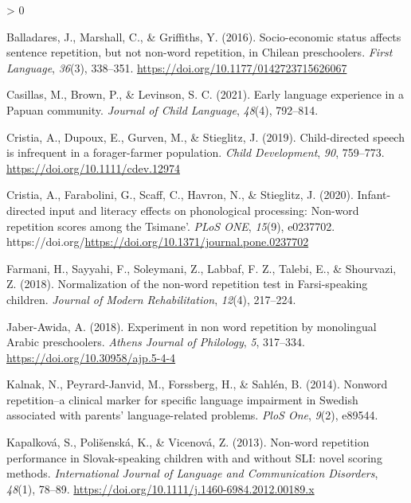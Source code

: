 \documentclass[
  american,
  ,doc,floatsintext]{apa6}
\newlength{\cslhangindent}
\newenvironment{CSLReferences}[2] %
 {%
  \setlength{\parindent}{0pt}
  \ifodd #1 \everypar{\setlength{\hangindent}{\cslhangindent}}\ignorespaces\fi
  \ifnum #2 > 0
  \setlength{\parskip}{#2\baselineskip}
  \fi
 }%
 {}
\begin{document}
\hypertarget{refs}{}
\begin{CSLReferences}{1}{0}
\leavevmode\hypertarget{ref-balladares2016socio}{}%
Balladares, J., Marshall, C., \& Griffiths, Y. (2016). {Socio-economic status affects sentence repetition, but not non-word repetition, in Chilean preschoolers}. \emph{{First Language}}, \emph{36}(3), 338--351. \url{https://doi.org/10.1177/0142723715626067}

\leavevmode\hypertarget{ref-casillas2021early}{}%
Casillas, M., Brown, P., \& Levinson, S. C. (2021). {Early language experience in a Papuan community}. \emph{Journal of Child Language}, \emph{48}(4), 792--814.

\leavevmode\hypertarget{ref-cristia2019child}{}%
Cristia, A., Dupoux, E., Gurven, M., \& Stieglitz, J. (2019). Child-directed speech is infrequent in a forager-farmer population. \emph{{Child Development}}, \emph{90}, 759--773. \url{https://doi.org/10.1111/cdev.12974}

\leavevmode\hypertarget{ref-cristia2020infant}{}%
Cristia, A., Farabolini, G., Scaff, C., Havron, N., \& Stieglitz, J. (2020). Infant-directed input and literacy effects on phonological processing: Non-word repetition scores among the {T}simane'. \emph{PLoS ONE}, \emph{15}(9), e0237702. https://doi.org/\url{https://doi.org/10.1371/journal.pone.0237702}

\leavevmode\hypertarget{ref-farmani2018normalization}{}%
Farmani, H., Sayyahi, F., Soleymani, Z., Labbaf, F. Z., Talebi, E., \& Shourvazi, Z. (2018). Normalization of the non-word repetition test in {F}arsi-speaking children. \emph{Journal of Modern Rehabilitation}, \emph{12}(4), 217--224.

\leavevmode\hypertarget{ref-jabere2018xperiment}{}%
Jaber-Awida, A. (2018). Experiment in non word repetition by monolingual {A}rabic preschoolers. \emph{Athens Journal of Philology}, \emph{5}, 317--334. \url{https://doi.org/10.30958/ajp.5-4-4}

\leavevmode\hypertarget{ref-kalnak2014nonword}{}%
Kalnak, N., Peyrard-Janvid, M., Forssberg, H., \& Sahlén, B. (2014). Nonword repetition--a clinical marker for specific language impairment in {S}wedish associated with parents' language-related problems. \emph{PloS One}, \emph{9}(2), e89544.

\leavevmode\hypertarget{ref-kapalkova2013non}{}%
Kapalková, S., Polišenská, K., \& Vicenová, Z. (2013). {Non-word repetition performance in Slovak-speaking children with and without SLI: novel scoring methods}. \emph{{International Journal of Language and Communication Disorders}}, \emph{48}(1), 78--89. \url{https://doi.org/10.1111/j.1460-6984.2012.00189.x}


\end{CSLReferences}
\end{document}
